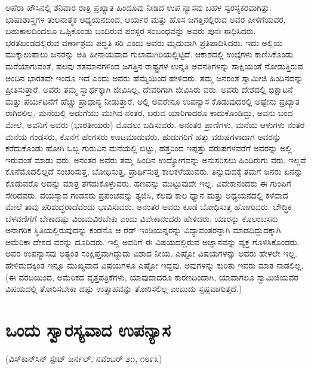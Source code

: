 ಅಪೆರಾ ಹೌಸಿನಲ್ಲಿ ಶನಿವಾರ ರಾತ್ರಿ ಪ್ರಖ್ಯಾತ ಹಿಂದೂವು ನೀಡಿದ ಉಪ ನ್ಯಾಸವು ಬಹಳ ಸ್ವರಸ್ಯಕರವಾಗಿತ್ತು. ಭಾಷಾಶಾಸ್ತ್ರಗಳ ತುಲನಾತ್ಮಕ ಅಧ್ಯಯನದಿಂದ, ಆರ್ಯರ ಮತ್ತು ಹೊಸ ಜಗತ್ತಿನಲ್ಲಿರುವ ಅವರ ಪೀಳಿಗೆಯವರ, ಬಹುಕಾಲದಿಂದಲೂ ಒಪ್ಪಿಕೊಂಡು ಬಂದಿರುವ ಪರಸ್ಪರ ಸಂಬಂಧವನ್ನು ಅವರು ಪುನಃ ಸಾಧಿಸಿದರು. ಭರತಖಂಡದಲ್ಲಿರುವ ವರ್ಣಾಶ್ರಮ ಪದ್ಧತಿ ಸರಿ ಎಂದು ಅವರು ಮೃದುವಾಗಿ ಪ್ರತಿಪಾದಿಸಿದರು. ಇದು ಅಲ್ಲಿಯ ಮುಕ್ಕಾಲುಪಾಲು ಜನರನ್ನು ಅತಿ ಹೀನಾಯವಾದ ಗುಲಾಮಗಿರಿಯಲ್ಲಿಟ್ಟಿದೆ. ಆಕಾಶದಲ್ಲಿ ಉಲ್ಕೆಗಳು ಕಾಣಿಸಿಕೊಂಡು ಮರೆಯಾಗುವಂತೆ, ಹಲವು ಶತಮಾನಗಳಿಂದ ಜಗತ್ತಿನ ರಾಷ್ಟ್ರಗಳ ಉನ್ನತಿ ಅವನತಿಗಳನ್ನು ಸಾಕ್ಷಿಯಂತೆ ನೋಡುತ್ತಿರುವ ಅಂದಿನ ಭಾರತವೇ ಇಂದೂ ಇದೆ ಎಂದು ಅವರು ಹೆಮ್ಮೆಯಿಂದ ಹೇಳಿದರು. ತಮ್ಮ ಜನರಂತೆ ಸ್ವಾಮೀಜಿ ಹಿಂದಿನದನ್ನು ಪ್ರೀತಿಸುತ್ತಾರೆ. ಅವರು ತಮ್ಮ ಸ್ವಾರ್ಥಕ್ಕಾಗಿ ಜೀವಿಸಿಲ್ಲ, ದೇವರಿಗಾಗಿ ಜೀವಿಸಿರು ವರು. ಅವರು ದೇಶದಲ್ಲಿ ಭಿಕ್ಷಾಟನೆ ಮತ್ತು ಪರ್ಯಟನೆಗೆ ಹೆಚ್ಚು ಪ್ರಾಧಾನ್ಯ ನೀಡುತ್ತಾರೆ. ಅಲ್ಲಿ ಅವರೇನೂ ಉಪನ್ಯಾಸ ಕೊಡುವುದರಲ್ಲಿ ಅಷ್ಟೇನು ಪ್ರಖ್ಯಾತ ರಾಗಿರಲಿಲ್ಲ. ಮನೆಯಲ್ಲಿ ಅಡುಗೆಯು ಮುಗಿದ ನಂತರ, ಬರುವ ಯಾರಿಗಾದರೂ ಕಾದುಕೊಂಡಿದ್ದು, ಅವನು ಬಂದ ಮೇಲೆ, ಅವನಿಗೆ ಅವರು (ಭಾರತೀಯರು) ಮೊದಲು ಬಡಿಸುವರು. ಅನಂತರ ಪ್ರಾಣಿಗಳು, ಮನೆಯ ಆಳುಗಳು ನಂತರ ಮನೆಯ ಗಂಡಸರು, ಕೊನೆಗೆ ಹೆಂಗಸರು ಊಟಮಾಡುವರು. ಹುಡುಗರಿಗೆ ಹತ್ತು ವರುಷಗಳಾದಾಗ ಅವರನ್ನು ಕರೆದುಕೊಂಡು ಹೋಗಿ ಒಬ್ಬ ಗುರುವಿನ ಮನೆಯಲ್ಲಿ ಬಿಟ್ಟು, ಹತ್ತರಿಂದ ಇಪ್ಪತ್ತು ವರುಷಗಳವರೆಗೆ ಅವರನ್ನು ಅಲ್ಲಿ ಇರುವಂತೆ ಮಾಡು ವರು. ಅನಂತರ ಅವರು ತಮ್ಮ ಹಿಂದಿನ ಉದ್ಯೋಗವನ್ನು ಅನುಸರಿಸಲು ಹಿಂದಿರುಗು ವರು. ಇಲ್ಲವೆ ಕೊನೆಮೊದಲಿಲ್ಲದೆ ಸಂಚರಿಸುತ್ತ, ಬೋಧಿಸುತ್ತ, ಪ್ರಾರ್ಥಿಸುತ್ತ ಕಾಲಕಳೆಯುವರು. ತಿನ್ನುವುದಕ್ಕೆ ತಮಗೆ ಜನರು ಏನನ್ನು ಕೊಡುವರೊ ಅದನ್ನು ಮಾತ್ರ ತೆಗೆದುಕೊಳ್ಳುವರು. ಹಣವನ್ನು ಮುಟ್ಟುವುದೇ ಇಲ್ಲ. ವಿವೇಕಾನಂದರು ಈ ಗುಂಪಿಗೆ ಸೇರಿದವರು. ವಯಸ್ಸಾದ ಗಂಡಸರು ಪ್ರಪಂಚವನ್ನು ತ್ಯಜಿಸಿ, ಕೆಲವು ಕಾಲ ಧ್ಯಾನ ಮತ್ತು ಅಧ್ಯಯನದಲ್ಲಿ ಕಳೆದಾದ ಮೇಲೆ ತಾವು ಪರಿಶುದ್ಧರಾದೆವೆಂದು ಭಾವಿಸುವರು. ಅನಂತರ ಅವರು ಕೂಡ ಬೋಧಿಸುತ್ತ ಹೋಗುವರು. ಬೌದ್ಧಿಕ ಬೆಳವಣಿಗೆಗೆ ಬೇಕಾದಷ್ಟು ವಿರಾಮವಿರಬೇಕು ಎಂದು ವಿವೇಕಾನಂದರು ಹೇಳಿದರು. ಯಾರನ್ನು ಕೊಲಂಬಸನು ಅನಾಗರಿಕ ಸ್ಥಿತಿಯಲ್ಲಿರುವುದನ್ನು ಕಂಡನೊ ಆ ರೆಡ್​ ಇಂಡಿಯನ್ನರನ್ನು ವಿದ್ಯಾವಂತರನ್ನಾಗಿ ಮಾಡದಿದ್ದುದಕ್ಕಾಗಿ ಅಮೆರಿಕಾ ದೇಶದ ವರನ್ನು ದೂರಿದರು. ಇಲ್ಲಿ ಅವರಿಗೆ ಈ ವಿಷಯದಲ್ಲಿರುವ ಅಜ್ಞಾನವನ್ನು ವ್ಯಕ್ತ ಗೊಳಿಸಿಕೊಂಡರು. ಅವರ ಉಪನ್ಯಾಸವು ಅತ್ಯಂತ ಸಂಕ್ಷಿಪ್ತವಾಗಿದ್ದುದು ವಿಶಾದ ನೀಯ. ಎಷ್ಟೋ ವಿಷಯಗಳನ್ನು ಅವರು ಹೇಳಲೇ ಇಲ್ಲ. ಹೇಳಿದುದಕ್ಕಿಂತ ಇನ್ನೂ ಮುಖ್ಯವಾದ ವಿಷಯಗಳೂ ಎಷ್ಟೋ ಇದ್ದವು. ಅವುಗಳನ್ನು ಕುರಿತು ಇವರು ಮಾತ ನಾಡಲಿಲ್ಲ. (ಈ ವರದಿಯಿಂದ, ಅಮೆರಿಕದ ವೃತ್ತಪತ್ರಿಕೆಗಳು, ಯಾವುದಾದರೂ ಕಾರಣದಿಂದಾಗಿ, ಯಾವಾಗಲೂ ಸ್ವಾಮಿಜಿಯವರ ವಿಷಯದಲ್ಲಿ ತೋರಿಸಬೇಕಾ ದಷ್ಟು ಉತ್ಸಾಹವನ್ನು ತೋರಿಸಲಿಲ್ಲ ಎಂಬುದು ಸ್ಪಷ್ಟವಾಗುತ್ತದೆ.)


\section{ಒಂದು ಸ್ವಾರಸ್ಯವಾದ ಉಪನ್ಯಾಸ}

\begin{center}
(ವಿಸ್​ಕಾನ್​ಸಿನ್​ ಸ್ಟೇಟ್​ ಜರ್ನಲ್​, ನವೆಂಬರ್​ ೨೧, ೧೮೯೩)
\end{center}

